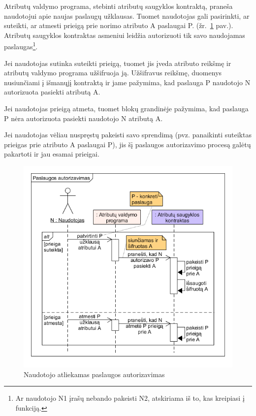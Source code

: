 Atributų valdymo programa, stebinti atributų saugyklos kontraktą, praneša naudotojui apie naujas
paslaugų užklausas. Tuomet naudotojas gali pasirinkti, ar suteikti, ar atmesti prieigą prie norimo atributo
A paslaugai P. (žr.\hypertarget{fig:givePermissions}{~\ref{fig:givePermissions} pav.}). Atributų saugyklos kontraktas
asmeniui leidžia autorizuoti tik savo naudojamas paslaugas\footnote{ Ar naudotojo N1 įrašų nebando pakeisti N2, atskiriama iš
to, kas kreipiasi į funkciją.}.

Jei naudotojas sutinka suteikti prieigą, tuomet jis įveda atributo reikšmę ir atributų valdymo programa užšifruoja ją.
Užšifravus reikšmę, duomenys nusiunčiami į išmanųjį kontraktą ir jame pažymima, kad paslauga P naudotojo N autorizuota
pasiekti atributą A.

Jei naudotojas prieigą atmeta, tuomet blokų grandinėje pažymima, kad paslauga P nėra autorizuota pasiekti naudotojo N atributą A.

Jei naudotojas vėliau nuspręstų pakeisti savo sprendimą (pvz. panaikinti suteiktas prieigas prie atributo A paslaugai P),
jis šį paslaugos autorizavimo procesą galėtų pakartoti ir jau esamai prieigai.


\begin{figure}[h]
    \centering
    \includegraphics[scale=0.65]{img/givePermissions}
    \caption{Naudotojo atliekamas paslaugos autorizavimas}
    \label{fig:givePermissions}
\end{figure}

